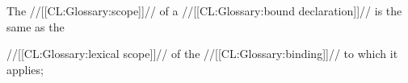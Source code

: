 













































































































The //[[CL:Glossary:scope]]// of a //[[CL:Glossary:bound declaration]]// is the same as the


//[[CL:Glossary:lexical scope]]//
of the //[[CL:Glossary:binding]]// to which it applies;

